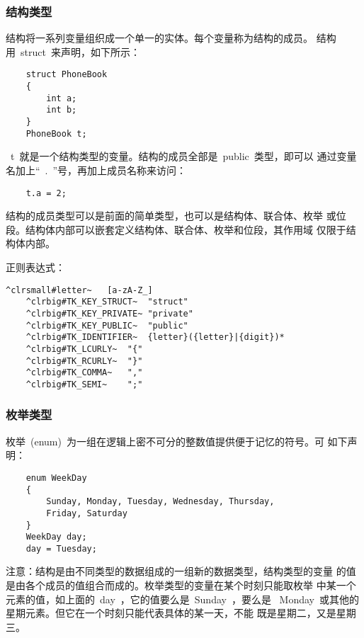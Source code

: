 \subsubsection{结构类型}

结构将一系列变量组织成一个单一的实体。每个变量称为结构的成员。
结构用~struct~来声明，如下所示：

\ttfamily
\begin{lstlisting}
    struct PhoneBook
    {
        int a;
        int b;
    }
    PhoneBook t;
\end{lstlisting}

~t~就是一个结构类型的变量。结构的成员全部是~public~类型，即可以
通过变量名加上``~.~''号，再加上成员名称来访问：

\ttfamily
\begin{lstlisting}
    t.a = 2;
\end{lstlisting}

结构的成员类型可以是前面的简单类型，也可以是结构体、联合体、枚举
或位段。结构体内部可以嵌套定义结构体、联合体、枚举和位段，其作用域
仅限于结构体内部。

正则表达式：

\begin{Verbatim}[frame=single, commandchars=^\#\~]
    ^clrsmall#letter~   [a-zA-Z_]
    ^clrbig#TK_KEY_STRUCT~  "struct"
    ^clrbig#TK_KEY_PRIVATE~ "private"
    ^clrbig#TK_KEY_PUBLIC~  "public"
    ^clrbig#TK_IDENTIFIER~  {letter}({letter}|{digit})*
    ^clrbig#TK_LCURLY~  "{"
    ^clrbig#TK_RCURLY~  "}"
    ^clrbig#TK_COMMA~   ","
    ^clrbig#TK_SEMI~    ";"
\end{Verbatim}

\subsubsection{枚举类型}

枚举~(enum)~为一组在逻辑上密不可分的整数值提供便于记忆的符号。可
如下声明：

\ttfamily
\begin{lstlisting}
    enum WeekDay
    {
        Sunday, Monday, Tuesday, Wednesday, Thursday,
        Friday, Saturday
    }
    WeekDay day;
    day = Tuesday;
\end{lstlisting}

注意：结构是由不同类型的数据组成的一组新的数据类型，结构类型的变量
的值是由各个成员的值组合而成的。枚举类型的变量在某个时刻只能取枚举
中某一个元素的值，如上面的~day~，它的值要么是~Sunday~，要么是
~Monday~或其他的星期元素。但它在一个时刻只能代表具体的某一天，不能
既是星期二，又是星期三。

